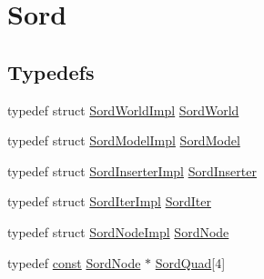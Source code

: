 \hypertarget{group__sord}{}\section{Sord}
\label{group__sord}
\subsection*{Typedefs}
\begin{DoxyCompactItemize}
\item 
typedef struct \hyperlink{struct_sord_world_impl}{Sord\+World\+Impl} \hyperlink{group__sord_ga133d918ec58f829198b2cf65f250ed69}{Sord\+World}
\item 
typedef struct \hyperlink{struct_sord_model_impl}{Sord\+Model\+Impl} \hyperlink{group__sord_gaea018cfebfedd10280b1d8dd6d650a28}{Sord\+Model}
\item 
typedef struct \hyperlink{struct_sord_inserter_impl}{Sord\+Inserter\+Impl} \hyperlink{group__sord_ga766743eaebfadb5a5a5d94af6226eb75}{Sord\+Inserter}
\item 
typedef struct \hyperlink{struct_sord_iter_impl}{Sord\+Iter\+Impl} \hyperlink{group__sord_ga59314650e0ab9b1cdeebc0bf7a0419fa}{Sord\+Iter}
\item 
typedef struct \hyperlink{struct_sord_node_impl}{Sord\+Node\+Impl} \hyperlink{group__sord_ga804ac7d56d9fdea50f2d1e7278b1f82b}{Sord\+Node}
\item 
typedef \hyperlink{getopt1_8c_a2c212835823e3c54a8ab6d95c652660e}{const} \hyperlink{group__sord_ga804ac7d56d9fdea50f2d1e7278b1f82b}{Sord\+Node} $\ast$ \hyperlink{group__sord_gac79773a042527877d00158c75a41bab2}{Sord\+Quad}\mbox{[}4\mbox{]}
\end{DoxyCompactItemize}
